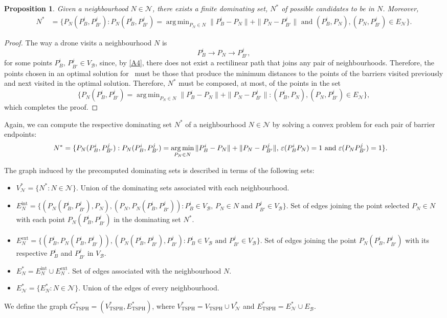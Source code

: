 \documentclass[a4paper,  review, authoryear, 1p., doubleblind]{elsarticle}
\DeclareMathOperator*{\argmin}{arg\,min}
\newcommand{\TSPHN}{{\sf{H-TSPHN}\xspace }}
\newcommand{\VB}{{V^{}_{\mathcal B}}}
\newcommand{\EB}{{E^{}_{\mathcal B}}}
\newcommand{\EN}{{E^{}_{\mathcal N}}}
\newcommand{\VTSPH}{{V_{\text{TSPH}}}}
\newcommand{\GTSPHS}{{G^{*}_{\text{TSPH}}}}
\newcommand{\VTSPHS}{{V^{*}_{\text{TSPH}}}}
\newcommand{\ETSPHS}{{E^{*}_{\text{TSPH}}}}
\newtheorem{prop}{Proposition}
\begin{document}
	\begin{prop}
		Given a neighbourhood $N\in\mathcal N$, there exists a finite dominating set, $N^*$ of possible candidates to be in $N$. Moreover,
		\begin{align*}
			N^*&=\{P_N(P_{B}^i, P_{B'}^j):P_N(P_{B}^i, P_{B'}^j)=\argmin_{P_N\in N} \|P_B^i - P_N\| + \|P_N - P_{B'}^j\|\text{ and }(P_B^i, P_N), (P_N, P_{B'}^j)\in \EN\}.
		\end{align*}
	\end{prop}
	\begin{proof}
		The way a drone visits a neighbourhood $N$ is
		$$P_{B}^i\longrightarrow P_N\longrightarrow P_{B'}^j,$$
		for some points $P_B^i,\, P_{B'}^j\in \VB$, since, by \ref{A4}, there does not exist a rectilinear path that joins any pair of neighbourhoods. Therefore, the points chosen in an optimal solution for \TSPHN \ must be those that produce the minimum distances to the points of the barriers visited previously and next visited in the optimal solution. Therefore, $N^*$ must be composed, at most, of the points in the set
		$$
		\{P_N(P_{B}^i, P_{B'}^j)=\argmin_{P_N\in N} \|P_B^i - P_N\| + \|P_N - P_{B'}^j\| :(P_B^i, P_N), (P_N, P_{B'}^j)\in \EN\},
		$$
		which completes the proof.
	\end{proof}
	Again, we can compute the respective dominating set $N^*$ of a neighbourhood $N\in\mathcal N$ by solving a convex problem for each pair of barrier endpoints: %
	\begin{align*}
		N^*&=\{P_N(P_{B}^i, P_{B'}^j):P_N(P_{B}^i, P_{B'}^j)=\argmin_{P_N\in N} \|P_B^i - P_N\| + \|P_N - P_{B'}^j\|,\,\varepsilonvar{P_B^i}{P_N} = 1 \text{ and } \varepsilonvar{P_N}{P_{B'}^j} = 1\}.
	\end{align*}
	
	
	The graph induced by the precomputed dominating sets is described in terms of the following sets:
	\begin{itemize}
		\item $V_\mathcal N^*=\{N^*:N\in\mathcal N\}$. Union of the dominating sets associated with each neighbourhood.
		\item $E_N^{\text{int}}=\{(P_N(P_B^i, P_{B'}^j), P_N), (P_N, P_N(P_B^i, P_{B'}^j)) :P_B^i\in\VB,\,P_N\in N\text{ and }P_{B'}^j\in\VB\}.$ Set of edges joining the point selected $P_N\in N$ with each point $P_N(P_B^i, P_{B'}^j)$ in the dominating set $N^*$.
		\item $E_N^{\text{ext}}=\{(P_B^i, P_N(P_B^i, P_{B'}^j)), (P_N(P_B^i, P_{B'}^j), P_{B'}^j):P_B^i\in\VB\text{ and }P_{B'}^j\in\VB\}.$ Set of edges joining the point $P_N(P_B^i, P_{B'}^j)$ with its respective $P_B^i$ and $P_{B'}^j$ in $\VB$.
		\item $E_N^*=E_N^{\text{int}}\cup E_N^{\text{ext}}$. Set of edges associated with the neighbourhood $N$.
		\item $E_\mathcal N^*= \{E_N^*:N\in\mathcal N\}.$ Union of the edges of every neighbourhood.
	\end{itemize}
	We define the graph $\GTSPHS=(\VTSPHS, \ETSPHS)$, where $\VTSPHS=\VTSPH\cup V^*_\mathcal N$ and $\ETSPHS=E^*_\mathcal N\cup\EB$.
	
\end{document}
